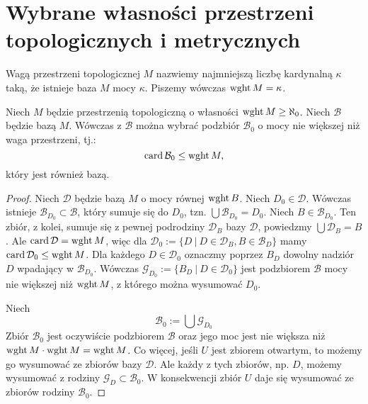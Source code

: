 \section{Wybrane własności przestrzeni topologicznych i metrycznych}

\begin{df}
  Wagą przestrzeni topologicznej $M$ nazwiemy najmniejszą liczbę kardynalną $\kappa$ taką, że istnieje baza $M$ mocy $\kappa$. Piszemy wówczas $\operatorname{wght} M = \kappa$.
\end{df}

\begin{lem} \label{lem:base-small}
  Niech $M$ będzie przestrzenią topologiczną o własności $\operatorname{wght} M \geq \aleph_0$. Niech $\mathcal B$ będzie bazą $M$. Wówczas z $\mathcal B$ można wybrać podzbiór $\mathcal B_0$ o mocy nie większej niż waga przestrzeni, tj.:
  \[
    \operatorname{card} \mathcal B_0 \leq \operatorname{wght} M,
  \]
  który jest również bazą.
  \begin{proof}
    Niech $\mathcal D$ będzie bazą $M$ o mocy równej $\operatorname{wght} B$. Niech $D_0 \in \mathcal D$. Wówczas istnieje $\mathcal B_{D_0} \subset \mathcal B$, który sumuje się do $D_0$, tzn. $\bigcup \mathcal B_{D_0} = D_0$. Niech $B \in \mathcal B_{D_0}$. Ten zbiór, z kolei, sumuje się z pewnej podrodziny $\mathcal D_B$ bazy $\mathcal D$, powiedzmy $\bigcup \mathcal D_B = B$. Ale $\operatorname{card}\mathcal D = \operatorname{wght} M$, więc dla $\mathcal D_0 := \{D\ |\ D \in \mathcal D_B, B \in \mathcal B_D\}$ mamy $\operatorname{card}\mathcal D_0 \leq \operatorname{wght} M$. Dla każdego $D \in \mathcal D_0$ oznaczmy poprzez $B_D$ dowolny nadziór $D$ wpadający w $\mathcal B_{D_0}$. Wówczas $\mathcal G_{D_0} := \{B_D\ |\ D \in \mathcal D_0\}$ jest podzbiorem $\mathcal B$ mocy nie większej niż $\operatorname{wght} M$, z którego można wysumować $D_0$.
    
    Niech
    \[
      \mathcal B_0 := \bigcup \mathcal G_{D_0}
    \]
    Zbiór $\mathcal B_0$ jest oczywiście podzbiorem $\mathcal B$ oraz jego moc jest nie większa niż $\operatorname{wght} M \cdot \operatorname{wght} M = \operatorname{wght} M$. Co więcej, jeśli $U$ jest zbiorem otwartym, to możemy go wysumować ze zbiorów bazy $\mathcal D$. Ale każdy z tych zbiorów, np. $D$, możemy wysumować z rodziny $\mathcal G_D \subset \mathcal B_0$. W konsekwencji zbiór $U$ daje się wysumować ze zbiorów rodziny $\mathcal B_0$.
  \end{proof}
\end{lem}

